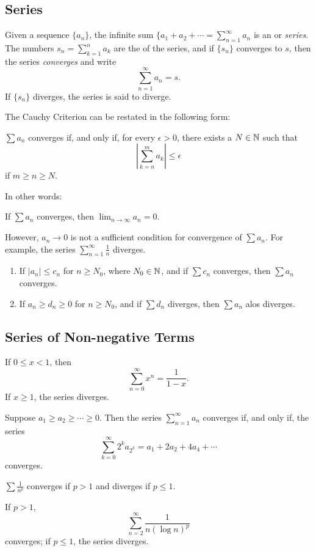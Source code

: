 \documentclass{article}
\begin{document}
\subsection{Series}
\begin{definition}
    Given a sequence $\{a_{n}\}$, the infinite sum $\{a_{1}+a_{2}+\dotsi=\sum_{n=1}^{\infty}a_{n}$ is an  or \textit{series}. The numbers $s_{n}=\sum_{k=1}^{n}a_{k}$ are the  of the series, and if $\{s_{n}\}$ converges to $s$, then the series \emph{converges} and write \[\sum_{n=1}^{\infty}a_{n}=s.\]If $\{s_{n}\}$ diverges, the series is said to diverge.
\end{definition}
The Cauchy Criterion can be restated in the following form:
\begin{theorem}
    $\sum a_{n}$ converges if, and only if, for every $\epsilon>0$, there exists a $N\in\mathbb N$ such that \[\left|\sum_{k=n}^{m}a_{k}\right|\leq \epsilon\]if $m\geq n\geq N.$
\end{theorem}
In other words:
\begin{theorem}
    If $\sum a_{n}$ converges, then $\lim_{n\rightarrow\infty}a_{n}=0.$
\end{theorem}
\begin{remark}
    However, $a_{n}\rightarrow0$ is not a sufficient condition for convergence of $\sum a_{n}$. For example, the series $\sum_{n=1}^{\infty}\frac{1}{n}$ diverges.
\end{remark}
\begin{theorem}
    \listhack 
    \begin{enumerate}
        \item If $|a_{n}|\leq c_{n}$ for $n\geq N_{0}$, where $N_{0}\in\mathbb N$, and if $\sum c_{n}$ converges, then $\sum a_{n}$ converges.
        \item If $a_{n}\geq d_{n}\geq 0$ for $n\geq N_{0}$, and if $\sum d_{n}$ diverges, then $\sum a_{n}$ alos diverges.
    \end{enumerate}
\end{theorem}
\subsection{Series of Non-negative Terms}
\begin{theorem}
    If $0\leq x<1$, then \[\sum_{n=0}^{\infty}x^{n}=\frac{1}{1-x}.\]If $x\geq 1$, the series diverges.
\end{theorem}
\begin{theorem}
    Suppose $a_{1}\geq a_{2}\geq \dotsi \geq 0$. Then the series $\sum_{n=1}^{\infty}a_{n}$ converges if, and only if, the series \[\sum_{k=0}^{\infty}2^{k}a_{2^{k}}=a_{1}+2a_{2}+4a_{4}+\dotsi\]converges.
\end{theorem}
\begin{theorem}[$p$-series]
    $\sum\frac{1}{n^{p}}$ converges if $p>1$ and diverges if $p\leq 1$.
\end{theorem}
\begin{theorem}
    If $p>1$, \[\sum_{n=2}^{\infty}\frac{1}{n(\log{n})^{p}}\]converges; if $p\leq 1$, the series diverges.
\end{theorem}
\end{document}
